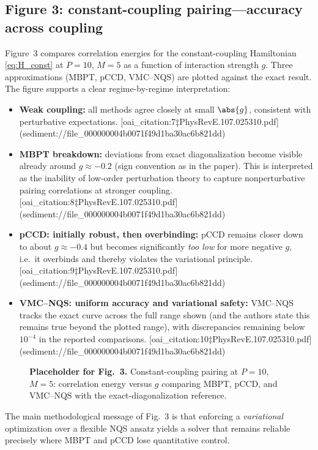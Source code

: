 \subsection{Figure 3: constant-coupling pairing---accuracy across coupling}
Figure~3 compares correlation energies for the constant-coupling Hamiltonian \eqref{eq:H_const} at $P=10$, $M=5$ as a
function of interaction strength $g$. Three approximations (MBPT, pCCD, VMC--NQS) are plotted against the exact
result. The figure supports a clear regime-by-regime interpretation:
\begin{itemize}
\item \textbf{Weak coupling:} all methods agree closely at small $\abs{g}$, consistent with perturbative expectations.  [oai_citation:7‡PhysRevE.107.025310.pdf](sediment://file_000000004b0071f49d1ba30ac6b821dd)
\item \textbf{MBPT breakdown:} deviations from exact diagonalization become visible already around $g\approx -0.2$
(sign convention as in the paper). This is interpreted as the inability of low-order perturbation theory to capture
nonperturbative pairing correlations at stronger coupling.  [oai_citation:8‡PhysRevE.107.025310.pdf](sediment://file_000000004b0071f49d1ba30ac6b821dd)
\item \textbf{pCCD: initially robust, then overbinding:} pCCD remains closer down to about $g\approx -0.4$ but becomes
significantly \emph{too low} for more negative $g$, i.e.\ it overbinds and thereby violates the variational principle.  [oai_citation:9‡PhysRevE.107.025310.pdf](sediment://file_000000004b0071f49d1ba30ac6b821dd)
\item \textbf{VMC--NQS: uniform accuracy and variational safety:} VMC--NQS tracks the exact curve across the full range
shown (and the authors state this remains true beyond the plotted range), with discrepancies remaining below $10^{-4}$
in the reported comparisons.  [oai_citation:10‡PhysRevE.107.025310.pdf](sediment://file_000000004b0071f49d1ba30ac6b821dd)
\end{itemize}

\begin{figure}[t]
\centering
\fbox{\rule{0pt}{48mm}\rule{0.92\linewidth}{0pt}}
\caption{\textbf{Placeholder for Fig.\ 3.} Constant-coupling pairing at $P=10$, $M=5$: correlation energy versus $g$ comparing
MBPT, pCCD, and VMC--NQS with the exact-diagonalization reference.}
\label{fig:fig3_placeholder}
\end{figure}

The main methodological message of Fig.~3 is that enforcing a \emph{variational} optimization over a flexible NQS
ansatz yields a solver that remains reliable precisely where MBPT and pCCD lose quantitative control. 

